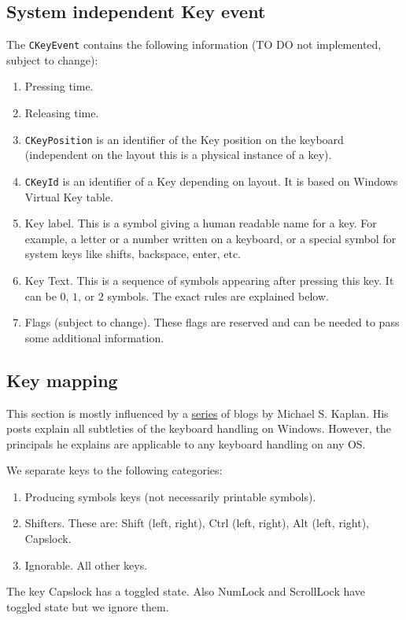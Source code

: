 \documentclass{article}
\begin{document}
\subsection{System independent Key event}

The \verb"CKeyEvent" contains the following information (TO DO not implemented, subject to change):
\begin{enumerate}
\item Pressing time.
\item Releasing time.
\item \verb"CKeyPosition" is an identifier of the Key position on the keyboard (independent on the layout this is a physical instance of a key).
\item \verb"CKeyId" is an identifier of a Key depending on layout. It is based on Windows Virtual Key table.
\item Key label. This is a symbol giving a human readable name for a key. For example, a letter or a number written on a keyboard, or a special symbol for system keys like shifts, backspace, enter, etc.
\item Key Text. This is a sequence of symbols appearing after pressing this key. It can be $0$, $1$, or $2$ symbols. The exact rules are explained below.
\item Flags (subject to change). These flags are reserved and can be needed to pass some additional information.
\end{enumerate}

\subsection{Key mapping}

This section is mostly influenced by a \href{http://archives.miloush.net/michkap/archive/2006/03/23/558658.html}{series} of blogs by Michael S. Kaplan. His posts explain all subtleties of the keyboard handling on Windows. However, the principals he explains are applicable to any keyboard handling on any OS.

We separate keys to the following  categories:
\begin{enumerate}
\item Producing symbols keys (not necessarily printable symbols).
\item Shifters. These are: Shift (left, right), Ctrl (left, right), Alt (left, right), Capslock.
\item Ignorable. All other keys.
\end{enumerate}
The key Capslock has a toggled state. Also NumLock and ScrollLock have toggled state but we ignore them.
\end{document}
